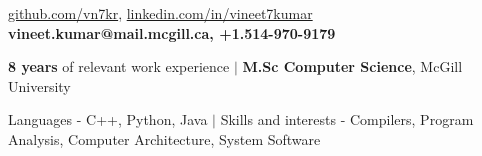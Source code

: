 \documentclass{resume} %
\begin{document}
\begin{hSubsection}
{
    \href{https://github.com/vn7kr}{github.com/vn7kr},
    \href{https://linkedin.com/in/vineet7kumar}{linkedin.com/in/vineet7kumar}
}
{
    \textbf{vineet.kumar@mail.mcgill.ca, +1.514-970-9179}
}
{%
}
\end{hSubsection}



\smallskip \smallskip 
\begin{rSection}{} \smallskip 
\begin{lSubsection} 
\item \textbf{8 years} of relevant work experience
        $\vert$ \textbf{M.Sc Computer Science}, McGill University
\item Languages - C++, Python, Java $\vert$ Skills and interests - Compilers, Program Analysis, Computer Architecture, System Software 
\end{lSubsection}
\end{rSection}
\end{document}

